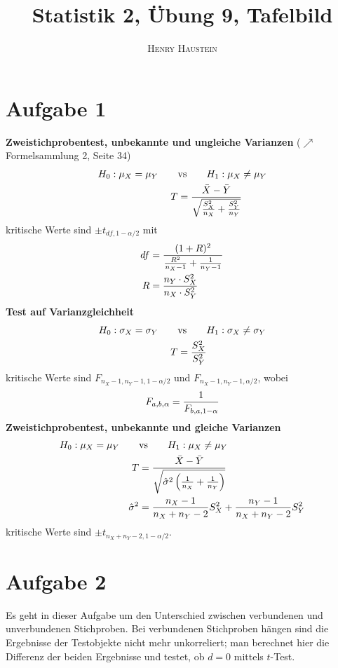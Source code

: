 \documentclass{article}
\title{\textbf{Statistik 2, Übung 9, Tafelbild}}
\author{\textsc{Henry Haustein}}
\date{}
\begin{document}
	\maketitle
	
	\section*{Aufgabe 1}
	\textbf{Zweistichprobentest, unbekannte und ungleiche Varianzen} ($\nearrow$ Formelsammlung 2, Seite 34)
	\begin{align}
		H_0: \mu_X = \mu_Y \qquad&\text{vs}\qquad H_1: \mu_X\neq \mu_Y \notag \\
		T &= \frac{\bar{X} - \bar{Y}}{\sqrt{\frac{S_X^2}{n_X} + \frac{S_Y^2}{n_Y}}} \notag
	\end{align}
	kritische Werte sind $\pm t_{df, 1-\alpha/2}$ mit
	\begin{align}
		df &= \frac{(1+R)^2}{\frac{R^2}{n_X-1} + \frac{1}{n_Y-1}} \notag \\
		R &= \frac{n_Y\cdot S_X^2}{n_X\cdot S_Y^2} \notag
	\end{align}
	\textbf{Test auf Varianzgleichheit}
	\begin{align}
		H_0: \sigma_X = \sigma_Y \qquad&\text{vs}\qquad H_1: \sigma_X\neq \sigma_Y \notag \\
		T &= \frac{S_X^2}{S_Y^2} \notag
	\end{align}
	kritische Werte sind $F_{n_X-1,n_Y-1,1-\alpha/2}$ und $F_{n_X-1,n_Y-1,\alpha/2}$, wobei
	\begin{align}
		F_{a,b,\alpha} = \frac{1}{F_{b,a,1-\alpha}} \notag
	\end{align}
	\textbf{Zweistichprobentest, unbekannte und gleiche Varianzen}
	\begin{align}
		H_0: \mu_X = \mu_Y \qquad&\text{vs}\qquad H_1: \mu_X\neq \mu_Y \notag \\
		T &= \frac{\bar{X} - \bar{Y}}{\sqrt{\hat{\sigma}^2\left(\frac{1}{n_X} + \frac{1}{n_Y}\right)}} \notag \\
		\hat{\sigma}^2 &= \frac{n_X-1}{n_X+n_Y-2}S_X^2 + \frac{n_Y-1}{n_X+n_Y-2}S_Y^2 \notag
	\end{align}
	kritische Werte sind $\pm t_{n_X+n_Y-2, 1-\alpha/2}$.
	
	\section*{Aufgabe 2}	
	Es geht in dieser Aufgabe um den Unterschied zwischen verbundenen und unverbundenen Stichproben. Bei verbundenen Stichproben hängen sind die Ergebnisse der Testobjekte nicht mehr unkorreliert; man berechnet hier die Differenz der beiden Ergebnisse und testet, ob $d=0$ mittels $t$-Test.
	
\end{document}
